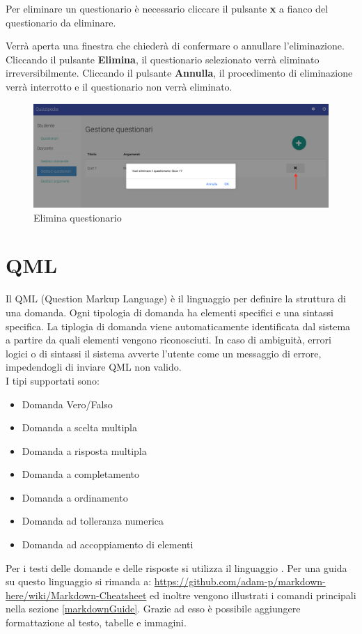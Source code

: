 \documentclass[12pt,a4paper]{article}
\begin{document}
		\par Per eliminare un questionario è necessario cliccare il pulsante \textbf{x} a fianco del questionario da eliminare. \\
		\par Verrà aperta una finestra che chiederà di confermare o annullare l'eliminazione. Cliccando il pulsante \textbf{Elimina}, il questionario selezionato verrà eliminato irreversibilmente. Cliccando il pulsante \textbf{Annulla}, il procedimento di eliminazione verrà interrotto e il questionario non verrà eliminato. \\
		
		\begin{figure}[H]	
			\centering
			\includegraphics[width=\linewidth]{../img/screenshot/eliminaQuestionario.png}
			\caption{Elimina questionario}
			\label{Elimina questionario}
		\end{figure}
		

	
	\section{QML}
	\par Il QML (Question Markup Language) è il linguaggio per definire la struttura di una domanda. Ogni tipologia di domanda ha elementi specifici e una sintassi specifica. La tiplogia di domanda viene automaticamente identificata dal sistema a partire da quali elementi vengono riconosciuti. In caso di ambiguità, errori logici o di sintassi il sistema avverte l'utente come un messaggio di errore, impedendogli di inviare QML non valido. \\
		
	 I tipi supportati sono:
	\begin{itemize}
		\item Domanda Vero/Falso
		\item Domanda a scelta multipla
		\item Domanda a risposta multipla
		\item Domanda a completamento
		\item Domanda a ordinamento
		\item Domanda ad tolleranza numerica
		\item Domanda ad accoppiamento di elementi
	\end{itemize}
	Per i testi delle domande e delle risposte si utilizza il linguaggio . Per una guida su questo linguaggio si rimanda a: \url{https://github.com/adam-p/markdown-here/wiki/Markdown-Cheatsheet} ed inoltre vengono illustrati i comandi principali nella sezione \ref{markdownGuide}. Grazie ad esso è possibile aggiungere formattazione al testo, tabelle e immagini.
	 
\end{document}
